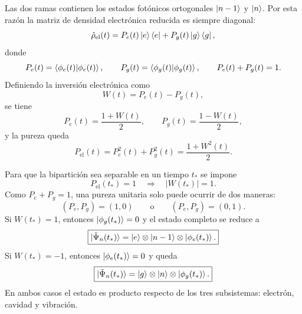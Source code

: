 Las dos ramas contienen los estados fot\'onicos ortogonales $\ket{n-1}$ y
$\ket n$. Por esta raz\'on la matriz de densidad electr\'onica reducida es
siempre diagonal:
\begin{equation}
  \hat\rho_{\mathrm{el}}(t)
  =
  P_e(t)\ket e\bra e
  +
  P_g(t)\ket g\bra g,
\end{equation}
donde
\begin{equation}
  P_e(t)=\braket{\phi_e(t)|\phi_e(t)},
  \qquad
  P_g(t)=\braket{\phi_g(t)|\phi_g(t)},
  \qquad
  P_e(t)+P_g(t)=1.
\end{equation}
Definiendo la inversi\'on electr\'onica como
\begin{equation}
  W(t)=P_e(t)-P_g(t),
\end{equation}
se tiene
\begin{equation}
  P_e(t)=\frac{1+W(t)}{2},
  \qquad
  P_g(t)=\frac{1-W(t)}{2},
\end{equation}
y la pureza queda
\begin{equation}
  \boxed{
  P_{\mathrm{el}}(t)
  =
  P_e^2(t)+P_g^2(t)
  =
  \frac{1+W^2(t)}{2}.
  }
\end{equation}

Para que la bipartici\'on sea separable en un tiempo $t_*$ se impone
\begin{equation}
  P_{\mathrm{el}}(t_*)=1
  \quad\Longrightarrow\quad
  |W(t_*)|=1.
\end{equation}
Como $P_e+P_g=1$, una pureza unitaria solo puede ocurrir de dos maneras:
\begin{equation}
  (P_e,P_g)=(1,0)
  \qquad\text{o}\qquad
  (P_e,P_g)=(0,1).
\end{equation}
Si $W(t_*)=1$, entonces $\ket{\phi_g(t_*)}=0$ y el estado completo se reduce a
\begin{equation}
  \boxed{
  \ket{\tilde\Psi_n(t_*)}
  =
  \ket e\otimes\ket{n-1}\otimes\ket{\phi_e(t_*)}.
  }
\end{equation}
Si $W(t_*)=-1$, entonces $\ket{\phi_e(t_*)}=0$ y queda
\begin{equation}
  \boxed{
  \ket{\tilde\Psi_n(t_*)}
  =
  \ket g\otimes\ket n\otimes\ket{\phi_g(t_*)}.
  }
\end{equation}
En ambos casos el estado es producto respecto de los tres subsistemas:
electr\'on, cavidad y vibraci\'on.

